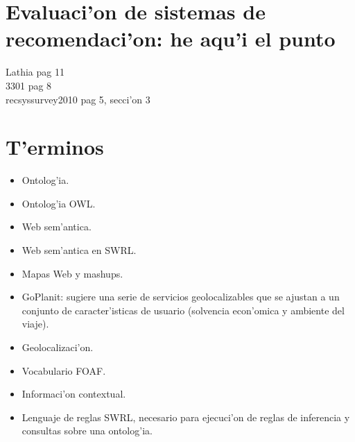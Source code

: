 \documentclass[11pt]{article}
\begin{document}
\section{Evaluaci'on de sistemas de recomendaci'on: he aqu'i el punto}
Lathia pag 11\\
3301 pag 8\\
recsyssurvey2010 pag 5, secci'on 3\\


\section{T'erminos}
\begin{itemize}
\item Ontolog'ia.
\item Ontolog'ia OWL.
\item Web sem'antica.
\item Web sem'antica en SWRL.
\item Mapas Web y mashups.
\item GoPlanit: sugiere una serie de servicios geolocalizables que se ajustan a un conjunto de caracter'isticas de usuario (solvencia econ'omica y ambiente del viaje).
\item Geolocalizaci'on.
\item Vocabulario FOAF.
\item Informaci'on contextual.
\item Lenguaje de reglas SWRL, necesario para ejecuci'on de reglas de inferencia y consultas sobre una ontolog'ia.
\end{itemize}



\end{document}

